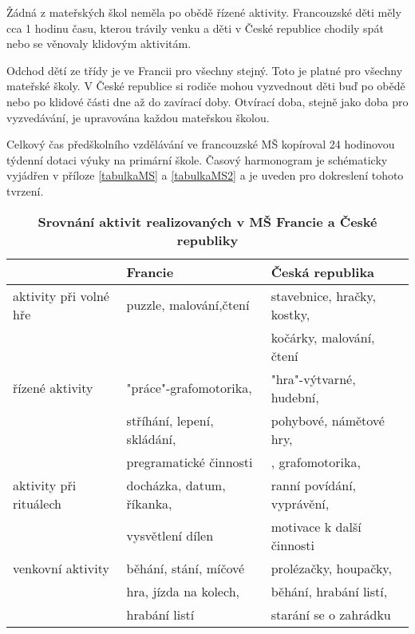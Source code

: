 	Žádná z mateřských škol neměla po obědě řízené aktivity. Francouzské děti měly cca 1 hodinu času, kterou trávily venku a děti v České republice chodily spát nebo se věnovaly klidovým aktivitám. 

	Odchod dětí ze třídy je ve Francii pro všechny stejný. Toto je platné pro všechny mateřské školy. V České republice si rodiče mohou vyzvednout děti buď po obědě nebo po klidové části dne až do zavírací doby. Otvírací doba, stejně jako doba pro vyzvedávání, je upravována každou mateřskou školou.

	Celkový čas předškolního vzdělávání ve francouzské MŠ kopíroval 24 hodinovou týdenní dotaci výuky na primární škole. Časový harmonogram je schématicky vyjádřen v příloze \ref{tabulkaMS} a \ref{tabulkaMS2} a je uveden pro dokreslení tohoto tvrzení.


\begin{table}[h]
	
	\begin{tabular}{|l|l|l|}
	\hline
	\rowcolor{grey}
								& \textbf{Francie}				& \textbf{Česká republika}	\\
	\hline
	\hline
\rowcolor{grey!10}	 aktivity při volné hře	&puzzle, malování,čtení 	&stavebnice, hračky, kostky,\\ 
\rowcolor{grey!10}	 						&							&kočárky, malování, čtení \\ 
\rowcolor{grey!50}	 řízené aktivity  		&"práce"-grafomotorika, 	&"hra"-výtvarné, hudební, \\ 
\rowcolor{grey!50}	 						&stříhání, lepení, skládání,&pohybové, námětové hry, \\ 
\rowcolor{grey!50}	 						&pregramatické činnosti 	&, grafomotorika, \\
\rowcolor{grey!10}	 aktivity při rituálech &docházka, datum, říkanka, 	&ranní povídání, vyprávění,\\ 
\rowcolor{grey!10}	 						&vysvětlení dílen			& motivace k další činnosti\\ 
\rowcolor{grey!50}   venkovní aktivity 		& běhání, stání, míčové		& prolézačky, houpačky, \\
\rowcolor{grey!50}							&hra, jízda na kolech, 		&běhání, hrabání listí,	\\
\rowcolor{grey!50}							&hrabání listí				&starání se o zahrádku	\\
	 \hline
	\end{tabular}
	
	\caption{ \textbf{Srovnání aktivit realizovaných v MŠ Francie a České republiky}
	}
	\label{srovnaniaktivit}
\end{table}

